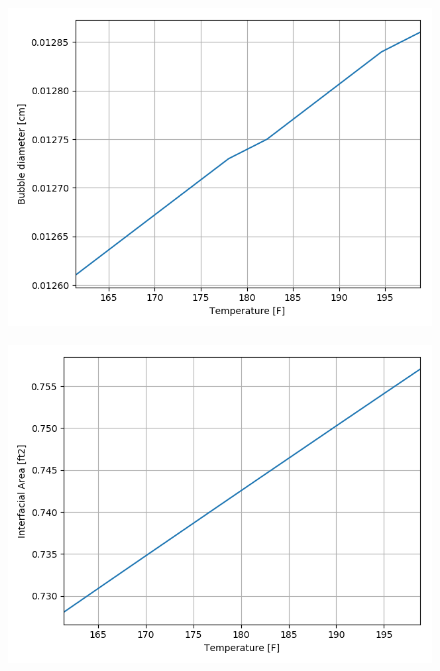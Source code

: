 \begin{figure}[p] 
\centering
\begin{minipage}{.5\textwidth}
  \centering
  \includegraphics[width=.9\linewidth]{images/BubbleDiaTemperatureIncrease.png}
  \label{fig:temp_increase_bubDia}
\end{minipage}%
\begin{minipage}{.5\textwidth}
  \centering
  \includegraphics[width=.9\linewidth]{images/IntAreaTemperatureIncrease.png}
  \label{fig:temp_increase_intArea}
\end{minipage}
\end{figure}

